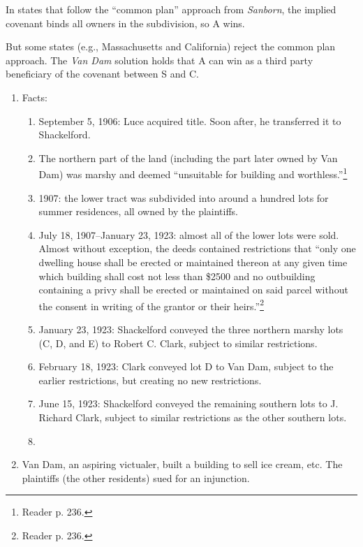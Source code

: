 In states that follow the ``common plan'' approach from \emph{Sanborn}, the 
implied covenant binds all owners in the subdivision, so A wins.

But some states (e.g., Massachusetts and California) reject the common plan 
approach. The \emph{Van Dam} solution holds that A can win as a third party 
beneficiary of the covenant between S and C.

\begin{enumerate}
    \item Facts:
    \begin{enumerate}
        \item September 5, 1906: Luce acquired title. Soon after, he 
        transferred it to Shackelford.
        \item The northern part of the land (including the part later owned by 
        Van Dam) was marshy and deemed ``unsuitable for building and 
        worthless.''\footnote{Reader p. 236.}
        \item 1907: the lower tract was subdivided into around a hundred lots 
        for summer residences, all owned by the plaintiffs.
        \item July 18, 1907--January 23, 1923: almost all of the lower lots 
        were sold. Almost without exception, the deeds contained restrictions 
        that ``only one dwelling house shall be erected or maintained thereon 
        at any given time which building shall cost not less than \$2500 and 
        no outbuilding containing a privy shall be erected or maintained on 
        said parcel without the consent in writing of the grantor or their 
        heirs.''\footnote{Reader p. 236.}
        \item January 23, 1923: Shackelford conveyed the three northern marshy 
        lots (C, D, and E) to Robert C. Clark, subject to similar 
        restrictions.
        \item February 18, 1923: Clark conveyed lot D to Van Dam, subject to 
        the earlier restrictions, but creating no new restrictions. 
        \item June 15, 1923: Shackelford conveyed the remaining southern lots 
        to J. Richard Clark, subject to similar restrictions as the other 
        southern lots.
        \item 
    \end{enumerate}
    \item Van Dam, an aspiring victualer, built a building to sell ice cream, 
    etc. The plaintiffs (the other residents) sued for an injunction.

\end{enumerate}

